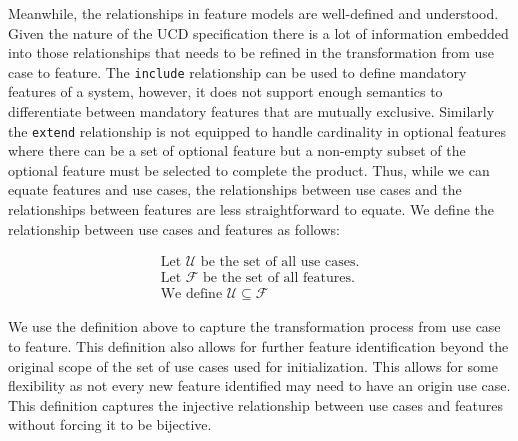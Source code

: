 
Meanwhile, the relationships in feature models are well-defined and understood. Given the nature of the \ac{UCD} specification there is a lot of information embedded into those relationships that needs to be refined in the transformation from use case to feature. The \texttt{include} relationship can be used to define mandatory features of a system, however, it does not support enough semantics to differentiate between mandatory features that are mutually exclusive. Similarly the \texttt{extend} relationship is not equipped to handle cardinality in optional features where there can be a set of optional feature but a non-empty subset of the optional feature must be selected to complete the product. Thus, while we can equate features and use cases, the relationships between use cases and the relationships between features are less straightforward to equate. We define the relationship between use cases and features as follows:

\begin{gather}
\label{feat-req_hierarchy}
	\text{Let } \mathcal{U} \text{ be the set of all use cases.}\\
	\text{Let } \mathcal{F} \text{ be the set of all features.}\\
	\text{We define } \mathcal{U} \subseteq \mathcal{F} 
\end{gather}

We use the definition above to capture the transformation process from use case to feature. This definition also allows for further feature identification beyond the original scope of the set of use cases used for initialization. This allows for some flexibility as not every new feature identified may need to have an origin use case. This definition captures the injective relationship between use cases and features without forcing it to be bijective.

